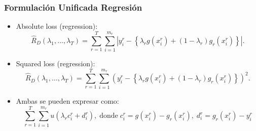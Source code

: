 \documentclass[aspectratio=43]{beamer}
\newcommand{\abs}[1]{\left|#1\right|}
\newcommand{\ntasks}{T}
\newcommand{\npertask}{m}
\newcommand{\sample}{D}
\newcommand{\risk}{R}
\newcommand{\emprisk}{\hat{\risk}_{\sample}}
\begin{document}
\begin{frame}
      \frametitle{Formulación Unificada Regresión}

      \begin{itemize}
            \item Absolute loss (regression):
            \begin{equation}
                \nonumber%
                \emprisk(\lambda_1, \ldots, \lambda_\ntasks) = \sum_{r=1}^\ntasks \sum_{i=1}^{\npertask_r} \abs{y_i^r - \left\lbrace\lambda_r g(x_i^r) + (1 - \lambda_r) g_r(x_i^r) \right \rbrace} .
            \end{equation}
            \item Squared loss (regression):
            \begin{equation}
                \nonumber%
                \emprisk(\lambda_1, \ldots, \lambda_\ntasks) = \sum_{r=1}^\ntasks \sum_{i=1}^{\npertask_r} \left( {y_i^r - \left\lbrace\lambda_r g(x_i^r) + (1 - \lambda_r) g_r(x_i^r) \right \rbrace} \right)^2 .
            \end{equation}
            \item Ambas se pueden expresar como:
            \begin{equation}
                  \nonumber
                  \sum_{r=1}^\ntasks \sum_{i=1}^{\npertask_r} u(\lambda_r c_i^r + d_i^r) ,\; \text{donde} \; c_i^r = g(x_i^r) - g_r(x_i^r)  , \;  d_i^r =  g_r(x_i^r) - y_i^r
              \end{equation}
        \end{itemize}

\end{frame}
\end{document}
